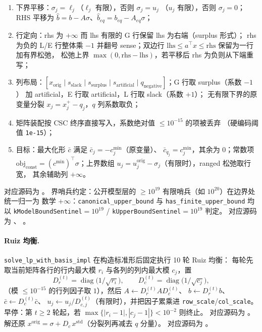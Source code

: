 \begin{enumerate}
  \item 下界平移：$\sigma_j = \ell_j$（$\ell_j$ 有限），否则 $\sigma_j = u_j$
        （$u_j$ 有限），否则 $\sigma_j = 0$；RHS 平移为
        $\hat b = b - A\sigma$、$\hat b_{eq} = b_{eq} - A_{eq}\sigma$；
  \item 行定向：rhs 为 $+\infty$ 而 lhs 有限的 G 行保留 lhs 为右端（surplus 形式）；
        rhs 为负的 L/E 行整体乘 $-1$ 并翻号 sense；双边行
        $\mathrm{lhs} \le a^{\top}x \le \mathrm{rhs}$ 保留为一行加有界松弛，
        松弛上界 $\max(0, \mathrm{rhs}-\mathrm{lhs})$，若平移后 rhs 为负则从下端重写；
  \item 列布局：$[x_{\text{orig}}\;|\; s_{\text{slack}}\;|\; s_{\text{surplus}}\;|\;
        s_{\text{artificial}}\;|\; q_{\text{negative}}]$；G 行取 surplus（系数 $-1$）
        加 artificial，E 行取 artificial，L 行取 slack（系数 $+1$）；
        无有限下界的原变量分裂 $x_j = x_j^{+} - q_j$，$q$ 列系数取负；
  \item 矩阵装配按 CSC 终序直接写入，系数绝对值 $\le 10^{-15}$ 的项被丢弃
        （硬编码阈值 \texttt{1e-15}）；
  \item 目标：最大化形 $\bar c$ 满足 $\bar c_j = -c^{\min}_j$（原变量）、
        $\bar c_{q_j} = c^{\min}_j$，其余为 $0$；常数项
        $\mathrm{obj}_{\text{const}} = (c^{\min})^{\top}\sigma$；上界数组
        $u_j = u_j^{\text{orig}} - \sigma_j$（有限时），ranged 松弛取行宽，
        其余辅助列 $+\infty$。
\end{enumerate}
对应源码为 。
界哨兵约定：公开模型层的 $\ge 10^{19}$ 有限哨兵（如 $10^{20}$）在边界处统一归一为
数学 $+\infty$：\texttt{canonical\_upper\_bound} 与 \texttt{has\_finite\_upper\_bound}
均以 \texttt{kModelBoundSentinel}${}=10^{19}$ / \texttt{kUpperBoundSentinel}${}=10^{19}$ 判定。
对应源码为 、
。

\paragraph{Ruiz 均衡.}
\texttt{solve\_lp\_with\_basis\_impl} 在构造标准形后固定执行 10 轮 Ruiz 均衡：
每轮先取当前矩阵各行的行内最大模 $r_i$ 与各列的列内最大模 $c_j$，置
\begin{equation}
  D_r^{(t)} = \operatorname{diag}\bigl(1/\sqrt{r_i}\bigr),\qquad
  D_c^{(t)} = \operatorname{diag}\bigl(1/\sqrt{c_j}\bigr),
\end{equation}
（模 $\le 10^{-15}$ 的行列因子取 $1$），然后 $A \leftarrow D_r^{(t)} A D_c^{(t)}$、
$b \leftarrow D_r^{(t)} b$、$\bar c \leftarrow D_c^{(t)} \bar c$、
$u_j \leftarrow u_j / D^{(t)}_{c,j}$（有限时），并把因子累乘进
\texttt{row\_scale}/\texttt{col\_scale}。早停：第 $t \ge 2$ 轮起，若
$\max\{|r_i - 1|, |c_j - 1|\} < 10^{-2}$ 则终止。
对应源码为 。
解还原 $x^{\text{orig}} = \sigma + D_c\, x^{\text{std}}$（分裂列再减去 $q$ 分量）。
对应源码为 。

